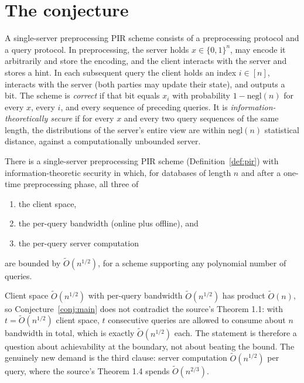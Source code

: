 \documentclass{aicr-conjecture}
\newcommand{\Ot}{\widetilde{O}}
\begin{document}
\section{The conjecture}\label{sec:conjectures}

\begin{definition}\label{def:pir}
A single-server preprocessing PIR scheme consists of a preprocessing
protocol and a query protocol. In preprocessing, the server holds $x \in
\{0,1\}^{n}$, may encode it arbitrarily and store the encoding, and the
client interacts with the server and stores a hint. In each subsequent
query the client holds an index $i \in [n]$, interacts with the server
(both parties may update their state), and outputs a bit. The scheme is
\emph{correct} if that bit equals $x_{i}$ with probability $1 -
\mathrm{negl}(n)$ for every $x$, every $i$, and every sequence of
preceding queries. It is \emph{information-theoretically secure} if for
every $x$ and every two query sequences of the same length, the
distributions of the server's entire view are within
$\mathrm{negl}(n)$ statistical distance, against a computationally
unbounded server.
\end{definition}

\begin{conjecture}\label{conj:main}
There is a single-server preprocessing PIR scheme
(Definition~\ref{def:pir}) with information-theoretic security in which,
for databases of length $n$ and after a one-time preprocessing phase,
all three of
\begin{enumerate}[nosep,label=(\alph*)]
  \item the client space,
  \item the per-query bandwidth (online plus offline), and
  \item the per-query server computation
\end{enumerate}
are bounded by $\Ot(n^{1/2})$, for a scheme supporting any polynomial
number of queries.
\end{conjecture}

\begin{remark}\label{rem:tight}
Client space $\Ot(n^{1/2})$ with per-query bandwidth $\Ot(n^{1/2})$ has
product $\Ot(n)$, so Conjecture~\ref{conj:main} does not contradict the
source's Theorem 1.1: with $t = \Ot(n^{1/2})$ client space, $t$
consecutive queries are allowed to consume about $n$ bandwidth in total,
which is exactly $\Ot(n^{1/2})$ each. The statement is therefore a
question about achievability at the boundary, not about beating the
bound. The genuinely new demand is the third clause: server computation
$\Ot(n^{1/2})$ per query, where the source's Theorem 1.4 spends
$\Ot(n^{2/3})$.
\end{remark}
\end{document}

